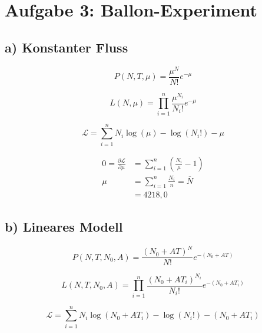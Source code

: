 \section*{Aufgabe 3: Ballon-Experiment}
\label{sec:Aufgabe3}
\subsection*{a) Konstanter Fluss}
\begin{equation}
    P(N,T,\mu)=\frac{\mu^N}{N!}e^{-\mu}
\end{equation}

\begin{equation}
    L({N},\mu)=\prod_{i=1}^n \frac{\mu^{N_i}}{N_i!}e^{-\mu}
\end{equation}

\begin{equation}
    \mathcal{L}=\sum_{i=1}^n N_i\log(\mu)-\log(N_i!)-\mu
\end{equation}

\begin{align}
    0=\frac{\partial \mathcal{L}}{\partial \mu}&=
                \sum_{i=1}^n \left(\frac{N_i}{\mu}-1\right)\nonumber\\
    \mu&=\sum_{i=1}^n \frac{N_i}{n}=\overline{N}\nonumber\\
       &=4218,0
\end{align}


\subsection*{b) Lineares Modell}

\begin{equation}
    P(N,T,N_0,A)=\frac{(N_0+AT)^N}{N!}e^{-(N_0+AT)}
\end{equation}

\begin{equation}
    L({N},{T},N_0,A)=\prod_{i=1}^n \frac{(N_0+AT_i)^{N_i}}{N_i!}e^{-(N_0+AT_i)}
\end{equation}

\begin{equation}
    \mathcal{L}=\sum_{i=1}^n N_i\log(N_0+AT_i)-\log(N_i!)-(N_0+AT_i)
\end{equation}

